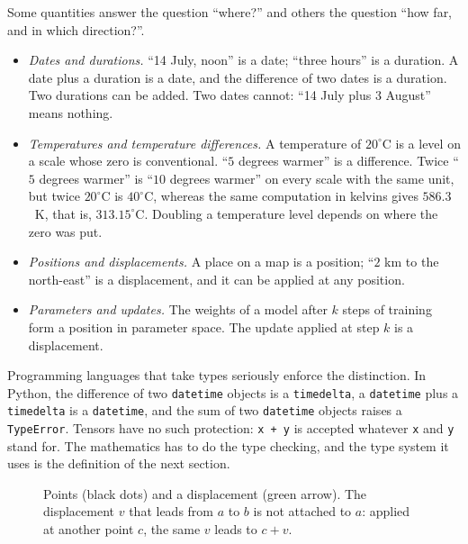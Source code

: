 \begin{notechapter}
Some quantities answer the question ``where?'' and others the question
``how far, and in which direction?''.

\begin{itemize}[nosep]
  \item \emph{Dates and durations.} ``14 July, noon'' is a date; ``three
        hours'' is a duration. A date plus a duration is a date, and the
        difference of two dates is a duration. Two durations can be added.
        Two dates cannot: ``14 July plus 3 August'' means nothing.
  \item \emph{Temperatures and temperature differences.} A temperature of
        $20^\circ$C is a level on a scale whose zero is conventional.
        ``$5$ degrees warmer'' is a difference. Twice ``$5$ degrees warmer''
        is ``$10$ degrees warmer'' on every scale with the same unit, but
        twice $20^\circ$C is $40^\circ$C, whereas the same computation in
        kelvins gives $586.3$~K, that is, $313.15^\circ$C. Doubling a
        temperature level depends on where the zero was put.
  \item \emph{Positions and displacements.} A place on a map is a position;
        ``$2$ km to the north-east'' is a displacement, and it can be
        applied at any position.
  \item \emph{Parameters and updates.} The weights of a model after $k$
        steps of training form a position in parameter space. The update
        applied at step $k$ is a displacement.
\end{itemize}

Programming languages that take types seriously enforce the distinction.
In Python, the difference of two \texttt{datetime} objects is a
\texttt{timedelta}, a \texttt{datetime} plus a \texttt{timedelta} is a
\texttt{datetime}, and the sum of two \texttt{datetime} objects raises a
\texttt{TypeError}. Tensors have no such protection: \texttt{x + y} is
accepted whatever \texttt{x} and \texttt{y} stand for. The mathematics has
to do the type checking, and the type system it uses is the definition of
the next section.

\begin{figure}[ht]
\centering
{}
\caption{Points (black dots) and a displacement (green arrow). The
displacement $v$ that leads from $a$ to $b$ is not attached to $a$: applied
at another point $c$, the same $v$ leads to $c + v$.}
\label{affine-spaces:fig:points-vectors}
\end{figure}


\end{notechapter}
